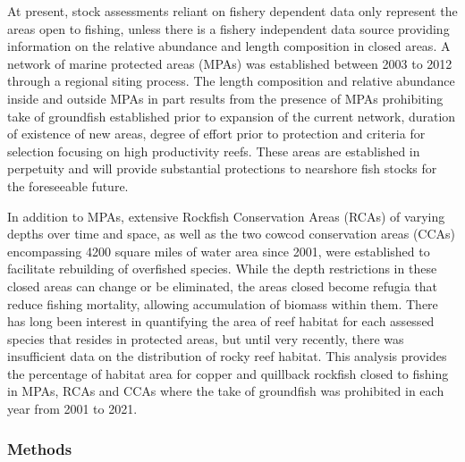 \documentclass[11pt,
  english,
  letterpaper,
]{article}
\begin{document}
\leavevmode\tagmcend\tagstructend


At present, stock assessments reliant on fishery dependent data only represent the areas open to fishing, unless there is a fishery independent data source providing information on the relative abundance and length composition in closed areas. A network of marine protected areas (MPAs) was established between 2003 to 2012 through a regional siting process. The length composition and relative abundance inside and outside MPAs in part results from the presence of MPAs prohibiting take of groundfish established prior to expansion of the current network, duration of existence of new areas, degree of effort prior to protection and criteria for selection focusing on high productivity reefs. These areas are established in perpetuity and will provide substantial protections to nearshore fish stocks for the foreseeable future.

\leavevmode\tagmcend\tagstructend\par


In addition to MPAs, extensive Rockfish Conservation Areas (RCAs) of varying depths over time and space, as well as the two cowcod conservation areas (CCAs) encompassing 4200 square miles of water area since 2001, were established to facilitate rebuilding of overfished species. While the depth restrictions in these closed areas can change or be eliminated, the areas closed become refugia that reduce fishing mortality, allowing accumulation of biomass within them. There has long been interest in quantifying the area of reef habitat for each assessed species that resides in protected areas, but until very recently, there was insufficient data on the distribution of rocky reef habitat. This analysis provides the percentage of habitat area for copper and quillback rockfish closed to fishing in MPAs, RCAs and CCAs where the take of groundfish was prohibited in each year from 2001 to 2021.

\leavevmode\tagmcend\tagstructend\par


\hypertarget{methods}{%
\subsubsection{Methods}\label{methods}}
\end{document}
